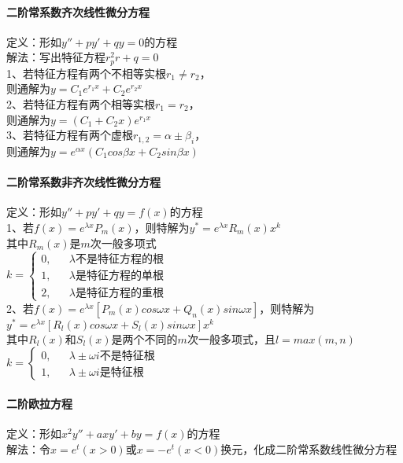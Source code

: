 \documentclass{article}
\begin{document}
\begin{flushleft}
	 \paragraph{二阶常系数齐次线性微分方程}
	 定义：形如$y''+py'+qy=0$的方程\\
	 解法：写出特征方程$r^2_pr+q=0$\\
	 1、若特征方程有两个不相等实根$r_1\neq r_2$，\\
	 则通解为$y=C_1e^{r_1x}+C_2e^{r_2x}$\\
	 2、若特征方程有两个相等实根$r_1=r_2$，\\
	 则通解为$y=(C_1+C_2x)e^{r_1x}$\\
	 3、若特征方程有两个虚根$r_{1,2}=\alpha\pm\beta_i$，\\
	 则通解为$y=e^{\alpha x}(C_1cos\beta x+C_2sin\beta x)$\\
	 
	 \paragraph{二阶常系数非齐次线性微分方程}
	 定义：形如$y''+py'+qy=f(x)$的方程\\
	 1、若$f(x)=e^{\lambda x}P_m(x)$，则特解为$y^*=e^{\lambda x}R_m(x)x^k$\\
	 其中$R_m(x)$是$m$次一般多项式\\
	 $k=\left\{
	 \begin{array}{lcl}
	 0,& & \lambda\mbox{不是特征方程的根}\\
	 1,& & \lambda\mbox{是特征方程的单根}\\
	 2,& & \lambda\mbox{是特征方程的重根}
	 \end{array} \right.$\\
	 2、若$f(x)=e^{\lambda x}[P_m(x)cos\omega x+Q_n(x)sin\omega x]$，则特解为$y^*=e^{\lambda x}[R_l(x)cos\omega x+S_l(x)sin\omega x]x^k$\\
	 其中$R_l(x)$和$S_l(x)$是两个不同的$m$次一般多项式，且$l=max(m,n)$\\
	 $k=\left\{
	 \begin{array}{lcl}
	 0,& & \lambda\pm\omega i\mbox{不是特征根}\\
	 1,& & \lambda\pm\omega i\mbox{是特征根}
	 \end{array} \right.$\\
	 
	 \paragraph{二阶欧拉方程}
	 定义：形如$x^2y''+axy'+by=f(x)$的方程\\
	 解法：令$x=e^t (x>0)$或$x=-e^t (x<0)$换元，化成二阶常系数线性微分方程\\
	 
\end{flushleft}
\end{document}
